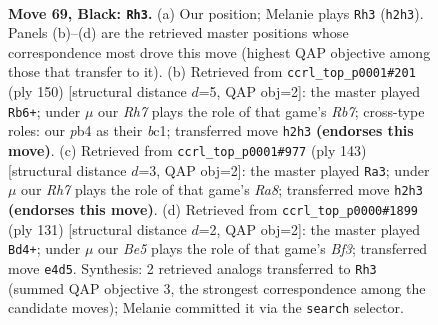 \documentclass[11pt]{article}
\begin{document}
\clearpage

\begin{figure}[p]\centering
\begin{subfigure}{0.46\textwidth}\centering
\resizebox{\linewidth}{!}{%
\newchessgame
\chessboard[
  setfen={6R1/R7/3k4/8/1P2b3/8/7r/4K3 b - - 12 69},
  showmover=false,
  pgfstyle=straightmove, color=movearrow, markmove={h2-h3}
]}
\caption{}
\end{subfigure}\hfill
\begin{subfigure}{0.46\textwidth}\centering
\resizebox{\linewidth}{!}{%
\newchessgame
\chessboard[
  setfen={8/1R6/5k2/8/7r/3B1K2/8/2b5 w - - 2 76},
  showmover=false,
  pgfstyle=straightmove, color=movearrow, markmove={b7-b6}
]}
\caption{}
\end{subfigure}
\\[4pt]
\begin{subfigure}{0.46\textwidth}\centering
\resizebox{\linewidth}{!}{%
\newchessgame
\chessboard[
  setfen={4k1b1/2R5/5P2/8/8/8/3K4/r7 b - - 4 72},
  showmover=false,
  pgfstyle=straightmove, color=movearrow, markmove={a1-a3}
]}
\caption{}
\end{subfigure}\hfill
\begin{subfigure}{0.46\textwidth}\centering
\resizebox{\linewidth}{!}{%
\newchessgame
\chessboard[
  setfen={8/8/5b2/R7/4k1P1/8/2r5/6K1 b - - 4 66},
  showmover=false,
  pgfstyle=straightmove, color=movearrow, markmove={f6-d4}
]}
\caption{}
\end{subfigure}
\caption{\textbf{Move 69, Black: \texttt{Rh3}.} (a) Our position; Melanie plays \texttt{Rh3} (\texttt{h2h3}). Panels (b)--(d) are the retrieved master positions whose correspondence most drove this move (highest QAP objective among those that transfer to it). (b) Retrieved from \texttt{ccrl\_top\_p0001\#201} (ply 150) [structural distance $d$=5, QAP obj=2]: the master played \texttt{Rb6+}; under $\mu$ our \emph{Rh7} plays the role of that game's \emph{Rb7}; cross-type roles: our \emph{p}b4 as their \emph{b}c1; transferred move \texttt{h2h3} \textbf{(endorses this move)}. (c) Retrieved from \texttt{ccrl\_top\_p0001\#977} (ply 143) [structural distance $d$=3, QAP obj=2]: the master played \texttt{Ra3}; under $\mu$ our \emph{Rh7} plays the role of that game's \emph{Ra8}; transferred move \texttt{h2h3} \textbf{(endorses this move)}. (d) Retrieved from \texttt{ccrl\_top\_p0000\#1899} (ply 131) [structural distance $d$=2, QAP obj=2]: the master played \texttt{Bd4+}; under $\mu$ our \emph{Be5} plays the role of that game's \emph{Bf3}; transferred move \texttt{e4d5}. Synthesis: 2 retrieved analogs transferred to \texttt{Rh3} (summed QAP objective 3, the strongest correspondence among the candidate moves); Melanie committed it via the \texttt{search} selector.}
\label{fig:thought-m137}
\end{figure}
\end{document}
